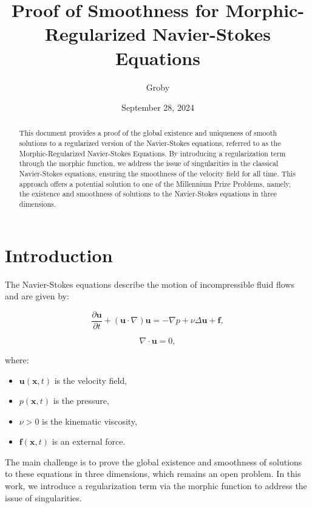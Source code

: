 \documentclass[12pt]{article}
\title{Proof of Smoothness for Morphic-Regularized Navier-Stokes Equations}
\author{Groby}
\date{September 28, 2024}
\begin{document}
\maketitle

\begin{abstract}
This document provides a proof of the global existence and uniqueness of smooth solutions to a regularized version of the Navier-Stokes equations, referred to as the Morphic-Regularized Navier-Stokes Equations. By introducing a regularization term through the morphic function, we address the issue of singularities in the classical Navier-Stokes equations, ensuring the smoothness of the velocity field for all time. This approach offers a potential solution to one of the Millennium Prize Problems, namely, the existence and smoothness of solutions to the Navier-Stokes equations in three dimensions.
\end{abstract}

\section{Introduction}
The Navier-Stokes equations describe the motion of incompressible fluid flows and are given by:

\begin{equation}
\frac{\partial \mathbf{u}}{\partial t} + (\mathbf{u} \cdot \nabla) \mathbf{u} = -\nabla p + \nu \Delta \mathbf{u} + \mathbf{f},
\end{equation}

\begin{equation}
\nabla \cdot \mathbf{u} = 0,
\end{equation}

where:

\begin{itemize}
    \item \(\mathbf{u}(\mathbf{x}, t)\) is the velocity field,
    \item \(p(\mathbf{x}, t)\) is the pressure,
    \item \(\nu > 0\) is the kinematic viscosity,
    \item \(\mathbf{f}(\mathbf{x}, t)\) is an external force.
\end{itemize}

The main challenge is to prove the global existence and smoothness of solutions to these equations in three dimensions, which remains an open problem. In this work, we introduce a regularization term via the morphic function to address the issue of singularities.
\end{document}
